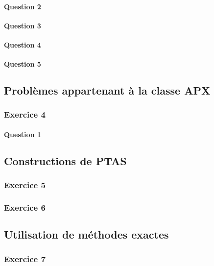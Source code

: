 \documentclass[a4paper, 12pt]{article}
\begin{document}
\paragraph{Question 2}
\paragraph{Question 3}
\paragraph{Question 4}
\paragraph{Question 5}

\subsection{Problèmes appartenant à la classe APX}

\subsubsection*{Exercice 4}

\paragraph{Question 1}

\subsection{Constructions de PTAS}

\subsubsection*{Exercice 5}

\subsubsection*{Exercice 6}

\subsection{Utilisation de méthodes exactes}

\subsubsection*{Exercice 7}
\end{document}

